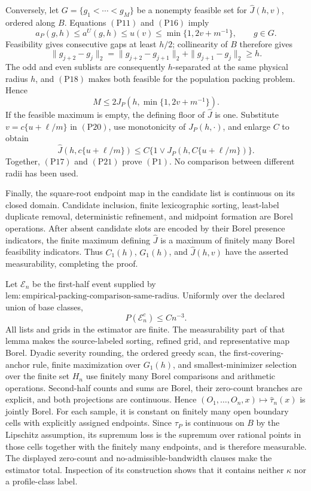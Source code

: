 Conversely, let \(G=\{g_1<\cdots<g_M\}\) be a nonempty feasible set for
\(\widehat J(h,v)\), ordered along \(B\).  Equations \((\mathrm{P11})\)
and \((\mathrm{P16})\) imply
\[
 a_P(g,h)\leq a^U(g,h)\leq u(v)
 \leq\min\{1,2v+m^{-1}\},\qquad g\in G.
 \tag{P18}
\]
Feasibility gives consecutive gaps at least \(h/2\); collinearity of
\(B\) therefore gives
\[
 \|g_{j+2}-g_j\|_2
 =\|g_{j+2}-g_{j+1}\|_2+\|g_{j+1}-g_j\|_2\geq h.
 \tag{P19}
\]
The odd and even sublists are consequently \(h\)-separated at the same
physical radius \(h\), and \((\mathrm{P18})\) makes both feasible for the
population packing problem.  Hence
\[
 M\leq2J_P(h,\min\{1,2v+m^{-1}\}).
 \tag{P20}
\]
If the feasible maximum is empty, the defining floor of \(\widehat J\) is
one.  Substitute \(v=c\{u+\ell/m\}\) in \((\mathrm{P20})\), use monotonicity
of \(J_P(h,\cdot)\), and enlarge \(C\) to obtain
\[
 \widehat J(h,c\{u+\ell/m\})
 \leq C\{1\vee J_P(h,C\{u+\ell/m\})\}.
 \tag{P21}
\]
Together, \((\mathrm{P17})\) and \((\mathrm{P21})\) prove \((\mathrm{P1})\).
No comparison between different radii has been used.

Finally, the square-root endpoint map in the candidate list is continuous
on its closed domain.  Candidate inclusion, finite lexicographic sorting,
least-label duplicate removal, deterministic refinement, and midpoint
formation are Borel operations.  After absent candidate slots are encoded
by their Borel presence indicators, the finite maximum defining
\(\widehat J\) is a maximum of finitely many Borel feasibility indicators.
Thus \(C_1(h)\), \(G_1(h)\), and \(\widehat J(h,v)\) have the asserted
measurability, completing the proof.

Let \(\mathcal E_n\) be the first-half event supplied by
\(\mathrm{lem{:}empirical\text{-}packing\text{-}comparison\text{-}same\text{-}radius}\).
Uniformly over the declared union of base classes,
\[
 P(\mathcal E_n^c)\leq Cn^{-3}.
 \tag{T1}
\]
All lists and grids in the estimator are finite.  The measurability part of
that lemma makes the source-labeled sorting, refined grid, and representative
map Borel.  Dyadic severity rounding, the ordered greedy scan, the
first-covering-anchor rule, finite maximization over \(G_1(h)\), and
smallest-minimizer selection over the finite set \(H_n\) use finitely many
Borel comparisons and arithmetic operations.  Second-half counts and sums
are Borel, their zero-count branches are explicit, and both projections are
continuous.  Hence
\((O_1,\ldots,O_n,x)\mapsto\widehat\tau_n(x)\) is jointly Borel.  For each
sample, it is constant on finitely many open boundary cells with explicitly
assigned endpoints.  Since \(\tau_P\) is continuous on \(B\) by the
Lipschitz assumption, its supremum loss is the supremum over rational points
in those cells together with the finitely many endpoints, and is therefore
measurable.  The displayed zero-count and no-admissible-bandwidth clauses
make the estimator total.  Inspection of its construction shows that it
contains neither \(\kappa\) nor a profile-class label.


